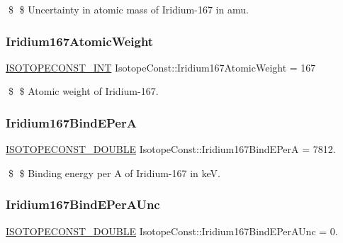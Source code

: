 \$ \$ Uncertainty in atomic mass of Iridium-\/167 in amu. \mbox{\label{group___isotope_const-_iridium-_ir167_gab935ebf04379f649e0056968a2a89553}} 
\subsubsection{\texorpdfstring{Iridium167\+Atomic\+Weight}{Iridium167AtomicWeight}}
{\footnotesize\ttfamily \mbox{\hyperlink{group___isotope_const-_macros_ga5f18360b3e99483a35c32d789e62621c}{I\+S\+O\+T\+O\+P\+E\+C\+O\+N\+S\+T\+\_\+\+I\+NT}} Isotope\+Const\+::\+Iridium167\+Atomic\+Weight = 167}

\$ \$ Atomic weight of Iridium-\/167. \mbox{\label{group___isotope_const-_iridium-_ir167_gaa8271bcd6acec38fa719eff53ab87de2}} 
\subsubsection{\texorpdfstring{Iridium167\+Bind\+E\+PerA}{Iridium167BindEPerA}}
{\footnotesize\ttfamily \mbox{\hyperlink{group___isotope_const-_macros_ga8f45a7272ce02c0b4c65c44636ed719a}{I\+S\+O\+T\+O\+P\+E\+C\+O\+N\+S\+T\+\_\+\+D\+O\+U\+B\+LE}} Isotope\+Const\+::\+Iridium167\+Bind\+E\+PerA = 7812.}

\$ \$ Binding energy per A of Iridium-\/167 in keV. \mbox{\label{group___isotope_const-_iridium-_ir167_gacac5cf8ca739e5c844ecfaa1cd99bd32}} 
\subsubsection{\texorpdfstring{Iridium167\+Bind\+E\+Per\+A\+Unc}{Iridium167BindEPerAUnc}}
{\footnotesize\ttfamily \mbox{\hyperlink{group___isotope_const-_macros_ga8f45a7272ce02c0b4c65c44636ed719a}{I\+S\+O\+T\+O\+P\+E\+C\+O\+N\+S\+T\+\_\+\+D\+O\+U\+B\+LE}} Isotope\+Const\+::\+Iridium167\+Bind\+E\+Per\+A\+Unc = 0.}

